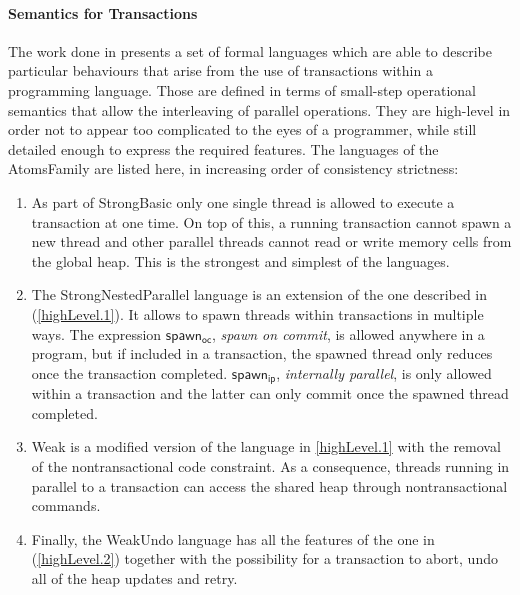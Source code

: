 \paragraph{Semantics for Transactions} The work done in \cite{semanticsTransactions} presents a set of formal languages which are able to describe particular behaviours that arise from the use of transactions within a programming language. Those are defined in terms of small-step operational semantics that allow the interleaving of parallel operations. They are high-level in order not to appear too complicated to the eyes of a programmer, while still detailed enough to express the required features. The languages of the \textsf{AtomsFamily} are listed here, in increasing order of consistency strictness:
\begin{enumerate}
	\item \label{highLevel.1} As part of \textsf{StrongBasic} only one single thread is allowed to execute a transaction at one time. On top of this, a running transaction cannot spawn a new thread and other parallel threads cannot read or write memory cells from the global heap. This is the strongest and simplest of the languages.
	
	\item The \textsf{StrongNestedParallel} language is an extension of the one described in (\ref{highLevel.1}). It allows to spawn threads within transactions in multiple ways. The expression $\mathsf{spawn_{oc}}$, \textit{spawn on commit}, is allowed anywhere in a program, but if included in a transaction, the spawned thread only reduces once the transaction completed. $\mathsf{spawn_{ip}}$, \textit{internally parallel}, is only allowed within a transaction and the latter can only commit once the spawned thread completed.
	
	\item \label{highLevel.2} \textsf{Weak} is a modified version of the language in \ref{highLevel.1} with the removal of the nontransactional code constraint. As a consequence, threads running in parallel to a transaction can access the shared heap through nontransactional commands.
	
	\item Finally, the \textsf{WeakUndo} language has all the features of the one in (\ref{highLevel.2}) together with the possibility for a transaction to abort, undo all of the heap updates and retry.
\end{enumerate}

